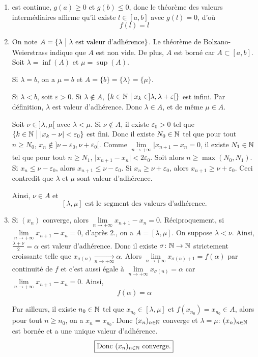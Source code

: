 \begin{solution}
	\phantom{}
	\begin{enumerate}
		\item {}
		est continue, $g(a)\geqslant0$ et $g(b)\leqslant0$, donc le théorème des valeurs intermédiaires affirme qu'il existe $l\in[a,b]$ avec $g(l)=0$, d'où 
		$$\boxed{f(l)=l}$$

		\item On note $A=\{\lambda\bigm| \lambda\text{ est valeur d'adhérence}\}$.
		Le théorème de Bolzano-Weierstrass indique que $A$ est non vide. De plus, $A$ est borné car $A\subset[a,b]$. Soit $\lambda=\inf(A)$ et $\mu=\sup(A)$. 
		
		Si $\lambda=b$, on a $\mu=b$ et $A=\{b\}=\{\lambda\}=\{\mu\}$.

		Si $\lambda<b$, soit $\varepsilon>0$. Si $\lambda\notin A$, $\{k\in\mathbb{N}\bigm| x_{k}\in]\lambda,\lambda+\varepsilon[\}$ est infini. Par définition, $\lambda$ est valeur d'adhérence. Donc $\lambda\in A$, et de même $\mu\in A$.

		Soit $\nu\in]\lambda,\mu[$ avec $\lambda<\mu$. Si $\nu\notin A$, il existe $\varepsilon_{0}>0$ tel que $\{k\in\mathbb{N}\bigm|\vert x_{k}-\nu\vert<\varepsilon_{0}\}$ est fini. Donc il existe $N_{0}\in\mathbb{N}$ tel que pour tout $n\geqslant N_{0}$, $x_{n}\notin]\nu-\varepsilon_{0},\nu+\varepsilon_{0}[$. Comme $\lim\limits_{n\to+\infty}\vert x_{n+1}-x_{n}=0$, il existe $N_{1}\in\mathbb{N}$ tel que pour tout $n\geqslant N_{1}$, $\vert x_{n+1}-x_{n}\vert<2\varepsilon_{0}$. 
		Soit alors $n\geqslant\max(N_{0},N_{1})$. Si $x_{n}\leqslant\nu-\varepsilon_{0}$, alors $x_{n+1}\leqslant\nu-\varepsilon_{0}$. Si $x_{n}\geqslant\nu+\varepsilon_{0}$, alors $x_{n+1}\geqslant\nu+\varepsilon_{0}$. Ceci contredit que $\lambda$ et $\mu$ sont valeur d'adhérence. 
		
		Ainsi, $\nu\in A$ et 
		$$\boxed{[\lambda,\mu] \text{ est le segment des valeurs d'adhérence.}}$$

		\item Si $(x_{n})$ converge, alors $\lim\limits_{n\to+\infty}x_{n+1}-x_{n}=0$. Réciproquement, si $\lim\limits_{n\to+\infty}x_{n+1}-x_{n}=0$, d'après 2., on a $A=[\lambda,\mu]$. On suppose $\lambda<\nu$. Ainsi, $\frac{\lambda+\nu}{2}=\alpha$ est valeur d'adhérence. Donc il existe $\sigma\colon\mathbb{N}\to\mathbb{N}$ strictement croissante telle que $x_{\sigma(n)}\xrightarrow[n\to+\infty]{}\alpha$. Alors $\lim\limits_{n\to+\infty}x_{\sigma(n)+1}=f(\alpha)$ par continuité de $f$ et c'est aussi égale à $\lim\limits_{n\to+\infty}x_{\sigma(n)}=\alpha$ car $\lim\limits_{n\to+\infty}x_{n+1}-x_{n}=0$.
		Ainsi, $$\boxed{f(\alpha)=\alpha}$$

		Par ailleurs, il existe $n_{0}\in\mathbb{N}$ tel que $x_{n_{0}}\in[\lambda,\mu]$ et $f(x_{n_{0}})=x_{n_{0}}\in A$, alors pour tout $n\geqslant n_{0}$, on a $x_{n}=x_{n_{0}}$. Donc $(x_{n})_{n\in\mathbb{N}}$ converge et $\lambda=\mu$: $(x_{n})_{n\in\mathbb{N}}$ est bornée et a une unique valeur d'adhérence. 
		$$\boxed{\text{Donc }(x_{n})_{n\in\mathbb{N}}\text{ converge.}}$$
	\end{enumerate}
\end{solution}

